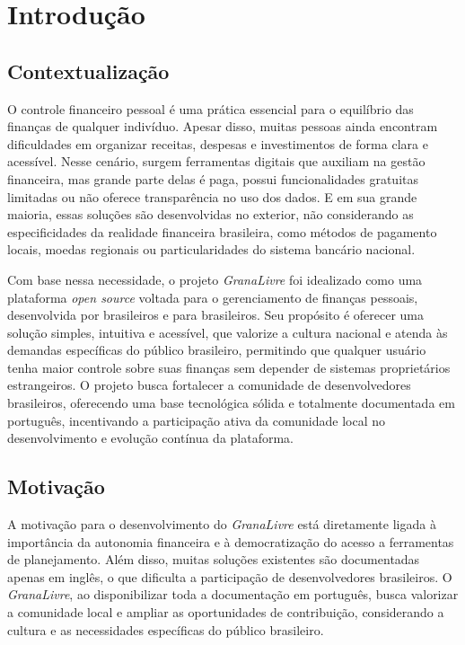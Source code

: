 \chapter{Introdução}\label{cap:intro}

\section{Contextualização}
O controle financeiro pessoal é uma prática essencial para o equilíbrio das finanças de qualquer indivíduo. Apesar disso, muitas pessoas ainda encontram dificuldades em organizar receitas, despesas e investimentos de forma clara e acessível. Nesse cenário, surgem ferramentas digitais que auxiliam na gestão financeira, mas grande parte delas é paga, possui funcionalidades gratuitas limitadas ou não oferece transparência no uso dos dados. E em sua grande maioria, essas soluções são desenvolvidas no exterior, não considerando as especificidades da realidade financeira brasileira, como métodos de pagamento locais, moedas regionais ou particularidades do sistema bancário nacional.

Com base nessa necessidade, o projeto \textit{GranaLivre} foi idealizado como uma plataforma \textit{open source} voltada para o gerenciamento de finanças pessoais, desenvolvida por brasileiros e para brasileiros. Seu propósito é oferecer uma solução simples, intuitiva e acessível, que valorize a cultura nacional e atenda às demandas específicas do público brasileiro, permitindo que qualquer usuário tenha maior controle sobre suas finanças sem depender de sistemas proprietários estrangeiros. O projeto busca fortalecer a comunidade de desenvolvedores brasileiros, oferecendo uma base tecnológica sólida e totalmente documentada em português, incentivando a participação ativa da comunidade local no desenvolvimento e evolução contínua da plataforma.

\section{Motivação}
A motivação para o desenvolvimento do \textit{GranaLivre} está diretamente ligada à importância da autonomia financeira e à democratização do acesso a ferramentas de planejamento. Além disso, muitas soluções existentes são documentadas apenas em inglês, o que dificulta a participação de desenvolvedores brasileiros. O \textit{GranaLivre}, ao disponibilizar toda a documentação em português, busca valorizar a comunidade local e ampliar as oportunidades de contribuição, considerando a cultura e as necessidades específicas do público brasileiro.

